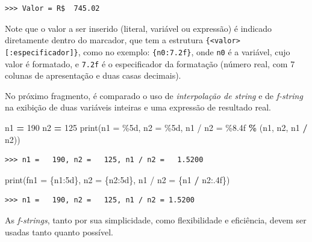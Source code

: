 \documentclass[
]{book}
\newenvironment{Shaded}{\begin{snugshade}}{\end{snugshade}}
\newcommand{\BuiltInTok}[1]{#1}
\newcommand{\DecValTok}[1]{\textcolor[rgb]{0.00,0.00,0.81}{#1}}
\newcommand{\NormalTok}[1]{#1}
\newcommand{\OperatorTok}[1]{\textcolor[rgb]{0.81,0.36,0.00}{\textbf{#1}}}
\newcommand{\SpecialCharTok}[1]{\textcolor[rgb]{0.00,0.00,0.00}{#1}}
\newcommand{\SpecialStringTok}[1]{\textcolor[rgb]{0.31,0.60,0.02}{#1}}
\newcommand{\StringTok}[1]{\textcolor[rgb]{0.31,0.60,0.02}{#1}}
\begin{document}
\begin{verbatim}
>>> Valor = R$  745.02
\end{verbatim}

Note que o valor a ser inserido (literal, variável ou expressão) é indicado diretamente dentro do marcador, que tem a estrutura \texttt{\{\textless{}valor\textgreater{}{[}:especificador{]}\}}, como no exemplo: \texttt{\{n0:7.2f\}}, onde \texttt{n0} é a variável, cujo valor é formatado, e \texttt{7.2f} é o especificador da formatação (número real, com 7 colunas de apresentação e duas casas decimais).

No próximo fragmento, é comparado o uso de \emph{interpolação de string} e de \emph{f-string} na exibição de duas variáveis inteiras e uma expressão de resultado real.

\begin{Shaded}
\begin{Highlighting}[]
\NormalTok{n1 }\OperatorTok{=} \DecValTok{190}
\NormalTok{n2 }\OperatorTok{=} \DecValTok{125}
\BuiltInTok{print}\NormalTok{(}\StringTok{\textquotesingle{}n1 = }\SpecialCharTok{\%5d}\StringTok{, n2 = }\SpecialCharTok{\%5d}\StringTok{, n1 / n2 = }\SpecialCharTok{\%8.4f}\StringTok{\textquotesingle{}} \OperatorTok{\%}\NormalTok{ (n1, n2, n1 }\OperatorTok{/}\NormalTok{ n2))}
\end{Highlighting}
\end{Shaded}

\begin{verbatim}
>>> n1 =   190, n2 =   125, n1 / n2 =   1.5200
\end{verbatim}

\begin{Shaded}
\begin{Highlighting}[]
\BuiltInTok{print}\NormalTok{(}\SpecialStringTok{f\textquotesingle{}n1 = }\SpecialCharTok{\{n1:5d\}}\SpecialStringTok{, n2 = }\SpecialCharTok{\{n2:5d\}}\SpecialStringTok{, n1 / n2 = }\SpecialCharTok{\{n1} \OperatorTok{/} \SpecialCharTok{n2:.4f\}}\SpecialStringTok{\textquotesingle{}}\NormalTok{)}
\end{Highlighting}
\end{Shaded}

\begin{verbatim}
>>> n1 =   190, n2 =   125, n1 / n2 = 1.5200
\end{verbatim}

As \emph{f-strings}, tanto por sua simplicidade, como flexibilidade e eficiência, devem ser usadas tanto quanto possível.
\end{document}

